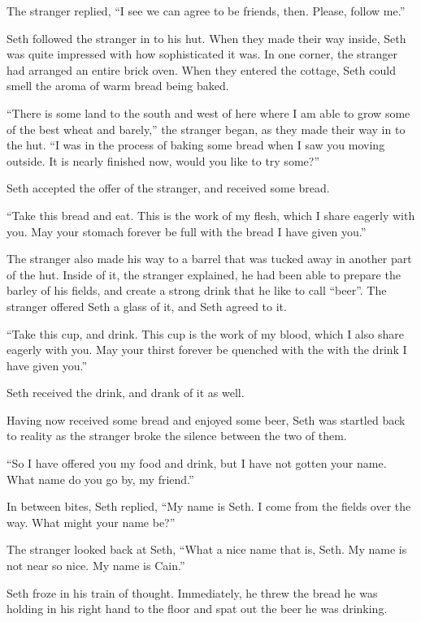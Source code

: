 \documentclass[12pt,twoside,titlepage]{report}
\begin{document}
The stranger replied, ``I see we can agree to be friends, then. Please,
follow me.''

Seth followed the stranger in to his hut. When they made their way
inside, Seth was quite impressed with how sophisticated it was. In one
corner, the stranger had arranged an entire brick oven. When they
entered the cottage, Seth could smell the aroma of warm bread being
baked.

``There is some land to the south and west of here where I am able to
grow some of the best wheat and barely,'' the stranger began, as they
made their way in to the hut. ``I was in the process of baking some
bread when I saw you moving outside. It is nearly finished now, would
you like to try some?''

Seth accepted the offer of the stranger, and received some bread.

``Take this bread and eat. This is the work of my flesh, which I share
eagerly with you. May your stomach forever be full with the bread I have
given you.''

The stranger also made his way to a barrel that was tucked away in
another part of the hut. Inside of it, the stranger explained, he had
been able to prepare the barley of his fields, and create a strong drink
that he like to call ``beer''. The stranger offered Seth a glass of it,
and Seth agreed to it.

``Take this cup, and drink. This cup is the work of my blood, which I
also share eagerly with you. May your thirst forever be quenched with
the with the drink I have given you.''

Seth received the drink, and drank of it as well.

Having now received some bread and enjoyed some beer, Seth was startled
back to reality as the stranger broke the silence between the two of
them.

``So I have offered you my food and drink, but I have not gotten your
name. What name do you go by, my friend.''

In between bites, Seth replied, ``My name is Seth. I come from the
fields over the way. What might your name be?''

The stranger looked back at Seth, ``What a nice name that is, Seth. My
name is not near so nice. My name is Cain.''

Seth froze in his train of thought. Immediately, he threw the bread he
was holding in his right hand to the floor and spat out the beer he was
drinking.
\end{document}
